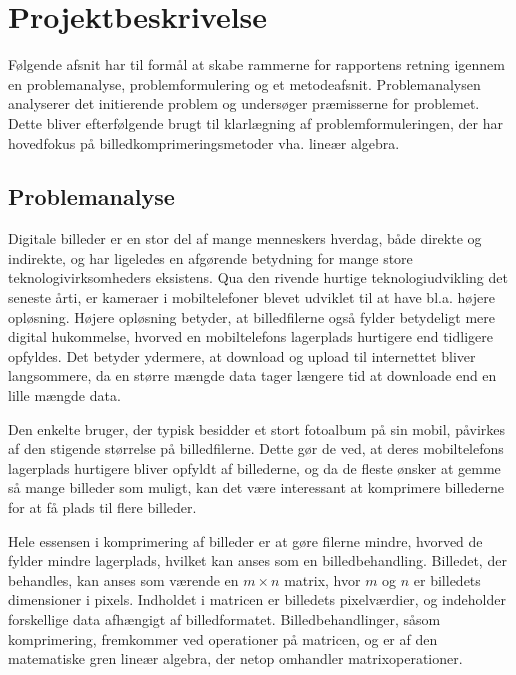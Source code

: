 \chapter{Projektbeskrivelse}
Følgende afsnit har til formål at skabe rammerne for rapportens retning igennem en problemanalyse, problemformulering og et metodeafsnit. Problemanalysen analyserer det initierende problem og undersøger præmisserne for problemet. Dette bliver efterfølgende brugt til klarlægning af problemformuleringen, der har hovedfokus på billedkomprimeringsmetoder vha. lineær algebra.

\section{Problemanalyse}
Digitale billeder er en stor del af mange menneskers hverdag, både direkte og indirekte, og har ligeledes en afgørende betydning for mange store teknologivirksomheders eksistens. Qua den rivende hurtige teknologiudvikling det seneste årti, er kameraer i mobiltelefoner blevet udviklet til at have bl.a. højere opløsning. Højere opløsning betyder, at billedfilerne også fylder betydeligt mere digital hukommelse, hvorved en mobiltelefons lagerplads hurtigere end tidligere opfyldes. Det betyder ydermere, at download og upload til internettet bliver langsommere, da en større mængde data tager længere tid at downloade end en lille mængde data.

Den enkelte bruger, der typisk besidder et stort fotoalbum på sin mobil, påvirkes af den stigende størrelse på billedfilerne. Dette gør de ved, at deres mobiltelefons lagerplads hurtigere bliver opfyldt af billederne, og da de fleste ønsker at gemme så mange billeder som muligt, kan det være interessant at komprimere billederne for at få plads til flere billeder.

Hele essensen i komprimering af billeder er at gøre filerne mindre, hvorved de fylder mindre lagerplads, hvilket kan anses som en billedbehandling. Billedet, der behandles, kan anses som værende en $m \times n$ matrix, hvor $m$ og $n$ er billedets dimensioner i pixels. Indholdet i matricen er billedets pixelværdier, og indeholder forskellige data afhængigt af billedformatet. Billedbehandlinger, såsom komprimering, fremkommer ved operationer på matricen, og er af den matematiske gren lineær algebra, der netop omhandler matrixoperationer.

